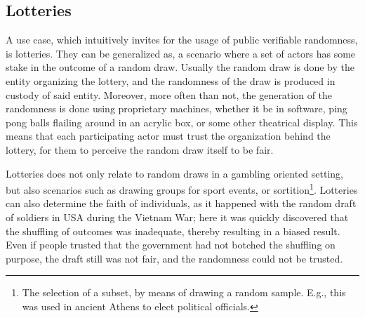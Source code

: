 \subsection{Lotteries}\label{subsec:usecase_lotteries}
A use case, which intuitively invites for the usage of public verifiable randomness, is lotteries.
They can be generalized as, a scenario where a set of actors has some stake in the outcome of a random draw.
Usually the random draw is done by the entity organizing the lottery, and the randomness of the draw is produced in custody of said entity.
Moreover, more often than not, the generation of the randomness is done using proprietary machines, whether it be in software, ping pong balls flailing around in an acrylic box, or some other theatrical display.
This means that each participating actor must trust the organization behind the lottery, for them to perceive the random draw itself to be fair.

Lotteries does not only relate to random draws in a gambling oriented setting, but also scenarios such as drawing groups for sport events, or sortition\footnote{The selection of a subset, by means of drawing a random sample. E.g., this was used in ancient Athens to elect political officials.}.
Lotteries can also determine the faith of individuals, as it happened with the random draft of soldiers in USA during the Vietnam War; here it was quickly discovered that the shuffling of outcomes was inadequate, thereby resulting in a biased result\cite{starr1997nonrandom}.
Even if people trusted that the government had not botched the shuffling on purpose, the draft still was not fair, and the randomness could not be trusted.
